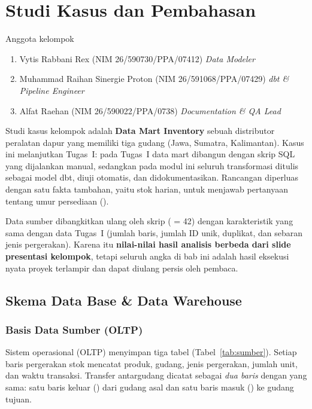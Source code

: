 \chapter{Studi Kasus dan Pembahasan}\label{chap:studikasus}
\begin{mybox}{Anggota kelompok}
\begin{enumerate}
    \itemsep0em
    \item Vytis Rabbani Rex (NIM 26/590730/PPA/07412) \textendash{} \textit{Data Modeler}
    \item Muhammad Raihan Sinergie Proton (NIM 26/591068/PPA/07429) \textendash{} \textit{dbt \& Pipeline Engineer}
    \item Alfat Raehan (NIM 26/590022/PPA/0738) \textendash{} \textit{Documentation \& QA Lead}
\end{enumerate}
\end{mybox}

Studi kasus kelompok adalah \textbf{Data Mart Inventory} sebuah distributor peralatan dapur yang memiliki tiga gudang (Jawa, Sumatra, Kalimantan). Kasus ini melanjutkan Tugas~I: pada Tugas~I data mart dibangun dengan skrip SQL yang dijalankan manual, sedangkan pada modul ini seluruh transformasi ditulis sebagai model dbt, diuji otomatis, dan didokumentasikan. Rancangan diperluas dengan satu fakta tambahan, yaitu  stok harian, untuk menjawab pertanyaan tentang umur persediaan ().

\begin{info}
Data sumber dibangkitkan ulang oleh skrip  ( = 42) dengan karakteristik yang sama dengan data Tugas~I (jumlah baris, jumlah ID unik, duplikat, dan sebaran jenis pergerakan). Karena itu \textbf{nilai-nilai hasil analisis berbeda dari slide presentasi kelompok}, tetapi seluruh angka di bab ini adalah hasil eksekusi nyata proyek terlampir dan dapat diulang persis oleh pembaca.
\end{info}

\section{Skema Data Base \& Data Warehouse}\label{sec:skema}

\subsection{Basis Data Sumber (OLTP)}
Sistem operasional (OLTP) menyimpan tiga tabel (Tabel~\ref{tab:sumber}). Setiap baris pergerakan stok mencatat produk, gudang, jenis pergerakan, jumlah unit, dan waktu transaksi. Transfer antargudang dicatat sebagai \emph{dua baris} dengan  yang sama: satu baris keluar () dari gudang asal dan satu baris masuk () ke gudang tujuan.

